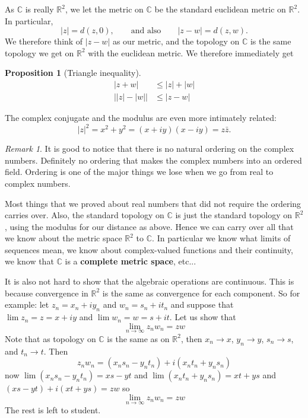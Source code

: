 \documentclass[12pt]{book}
\newcommand{\abs}[1]{\left\lvert {#1} \right\rvert}
\newcommand{\C}{{\mathbb{C}}}
\newcommand{\R}{{\mathbb{R}}}
\theoremstyle{plain}
\newtheorem{prop}[thm]{Proposition}
\theoremstyle{remark}
\newtheorem{remark}[thm]{Remark}
\theoremstyle{definition}
\theoremstyle{exercise}
\theoremstyle{example}
\begin{document}
As $\C$ is really $\R^2$, we let the metric on $\C$ be the standard
euclidean metric on $\R^2$.
In particular,
\begin{equation*}
\abs{z} = d(z,0) , \qquad 
\text{and also} \qquad 
\abs{z-w} = d(z,w) .
\end{equation*}
We therefore think of $\abs{z-w}$ as our metric, and the topology on $\C$ is
the same topology we get on $\R^2$ with the euclidean metric.
We therefore immediately get

\begin{prop}[Triangle inequality]
\begin{align*}
\abs{z+w} & \leq \abs{z}+\abs{w} \\
\big\lvert \abs{z}-\abs{w} \big\rvert & \leq \abs{z-w}
\end{align*}
\end{prop}

The complex conjugate and the modulus are even more intimately related:
\begin{equation*}
\abs{z}^2 =
x^2+y^2 =
(x+iy)(x-iy) =
z \bar{z} .
\end{equation*}

\begin{remark}
It is good to notice that there is no natural ordering on the complex numbers.
Definitely no ordering that makes the complex numbers into an ordered field.
Ordering is one of the major things we lose when we go from real to complex
numbers.
\end{remark}


Most things that we proved about real numbers that did not require
the ordering carries over.  Also, the standard topology on $\C$ is
just the standard topology on $\R^2$, using the modulus for our distance
as above.  Hence we can carry over all that we know about the metric
space $\R^2$ to $\C$.  In particular we know what limits of
sequences mean, we know about complex-valued functions and their continuity,
we know that $\C$ is a \textbf{complete metric space},
etc...

It is also not hard to show that the algebraic operations are
continuous.  This is because convergence in 
$\R^2$ is the same as convergence for each component.  So for example:
let $z_n = x_n + iy_n$ and
$w_n = s_n + it_n$ and suppose that
$\lim z_n = z = x+iy$ and $\lim w_n = w = s+it$.
Let us show that
$$
\lim_{n\to\infty} z_n w_n = zw
$$
Note that as topology on $\C$ is the same as on $\R^2$, then
$x_n \to x$, $y_n \to y$, $s_n \to s$, and $t_n \to t$.  Then
$$
z_n w_n = (x_ns_n-y_nt_n) + i(x_nt_n+y_ns_n)
$$
now 
$\lim (x_ns_n-y_nt_n) = xs-yt$ and
$\lim (x_nt_n+y_ns_n) = xt+ys$ and
$(xs-yt)+i(xt+ys) = zw$ so
$$
\lim_{n\to\infty} z_n w_n = zw
$$
The rest is left to student.  
\end{document}
